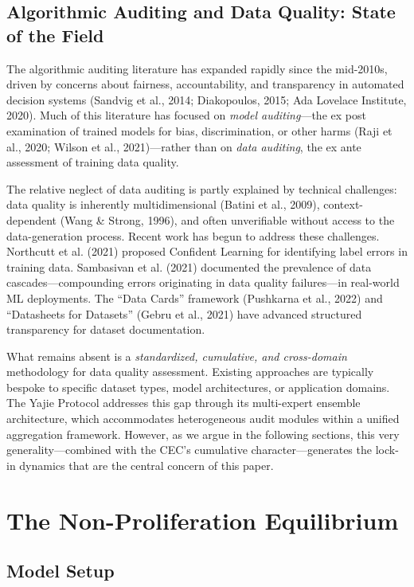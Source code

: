 \documentclass[12pt,a4paper]{ctexart}
\theoremstyle{definition}
\theoremstyle{remark}
\begin{document}
\subsection{Algorithmic Auditing and Data Quality: State of the Field}

The algorithmic auditing literature has expanded rapidly since the mid-2010s, driven by concerns about fairness, accountability, and transparency in automated decision systems (Sandvig et al., 2014; Diakopoulos, 2015; Ada Lovelace Institute, 2020). Much of this literature has focused on \textit{model auditing}—the ex post examination of trained models for bias, discrimination, or other harms (Raji et al., 2020; Wilson et al., 2021)—rather than on \textit{data auditing}, the ex ante assessment of training data quality.

The relative neglect of data auditing is partly explained by technical challenges: data quality is inherently multidimensional (Batini et al., 2009), context-dependent (Wang \& Strong, 1996), and often unverifiable without access to the data-generation process. Recent work has begun to address these challenges. Northcutt et al. (2021) proposed Confident Learning for identifying label errors in training data. Sambasivan et al. (2021) documented the prevalence of data cascades—compounding errors originating in data quality failures—in real-world ML deployments. The ``Data Cards'' framework (Pushkarna et al., 2022) and ``Datasheets for Datasets'' (Gebru et al., 2021) have advanced structured transparency for dataset documentation.

What remains absent is a \textit{standardized, cumulative, and cross-domain} methodology for data quality assessment. Existing approaches are typically bespoke to specific dataset types, model architectures, or application domains. The Yajie Protocol addresses this gap through its multi-expert ensemble architecture, which accommodates heterogeneous audit modules within a unified aggregation framework. However, as we argue in the following sections, this very generality—combined with the CEC's cumulative character—generates the lock-in dynamics that are the central concern of this paper.

\section{The Non-Proliferation Equilibrium}

\subsection{Model Setup}
\end{document}
